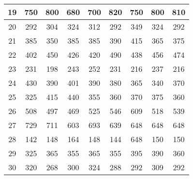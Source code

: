 \documentclass[11pt]{article}
\begin{document}
\begin{table}[!h]
\begin{center}
\begin{tabular}{| c | c | c | c | c | c | c | c | c |}
			19 & 750 & 800 & 680 & 700 & 820 & 750 & 800 & 810 \\ \hline
			20 & 292 & 304 & 324 & 312 & 292 & 349 & 324 & 292 \\ \hline
			21 & 385 & 350 & 385 & 385 & 390 & 415 & 365 & 375 \\ \hline
			22 & 402 & 450 & 426 & 420 & 490 & 438 & 456 & 474 \\ \hline
			23 & 231 & 198 & 243 & 252 & 231 & 216 & 237 & 216 \\ \hline
			24 & 430 & 390 & 401 & 390 & 380 & 365 & 340 & 370 \\ \hline
			25 & 325 & 415 & 440 & 355 & 360 & 370 & 375 & 360 \\ \hline
			26 & 508 & 497 & 469 & 525 & 546 & 609 & 518 & 539 \\ \hline
			27 & 729 & 711 & 603 & 693 & 639 & 648 & 648 & 648 \\ \hline
			28 & 142 & 148 & 164 & 148 & 144 & 648 & 150 & 150 \\ \hline
			29 & 325 & 365 & 355 & 365 & 355 & 395 & 390 & 360 \\ \hline
			30 & 320 & 268 & 300 & 324 & 288 & 292 & 309 & 292 \\ \hline
		\end{tabular}
	\end{center}
\end{table}

\pagebreak
\end{document}
